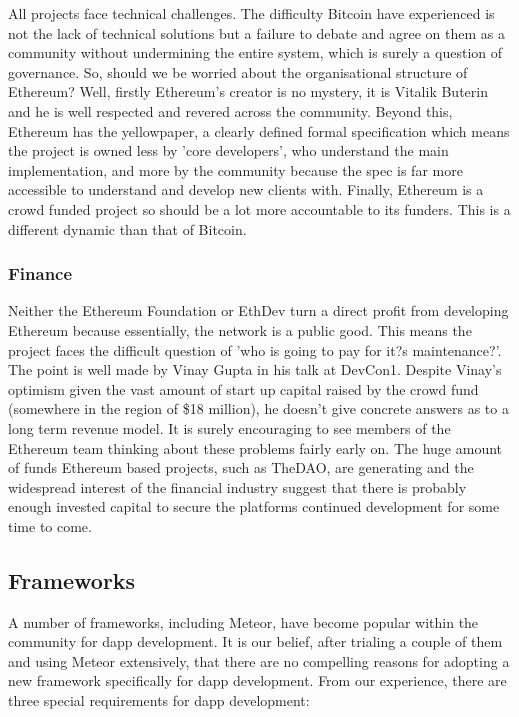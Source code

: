 All projects face technical challenges. The difficulty Bitcoin have experienced is not the lack of technical solutions but a failure to debate and agree on them as a community without undermining the entire system, which is surely a question of governance. So, should we be worried about the organisational structure of Ethereum? Well, firstly Ethereum's creator is no mystery, it is Vitalik Buterin and he is well respected and revered across the community. Beyond this, Ethereum has the yellowpaper\cite{wood2014ethereum}, a clearly defined formal specification which means the project is owned less by 'core developers', who understand the main implementation, and more by the community because the spec is far more accessible to understand and develop new clients with. Finally, Ethereum is a crowd funded project so should be a lot more accountable to its funders. This is a different dynamic than that of Bitcoin.\\

\subsubsection{Finance}
Neither the Ethereum Foundation or EthDev turn a direct profit from developing Ethereum because essentially, the network is a public good. This means the project faces the difficult question of 'who is going to pay for it?s maintenance?'. The point is well made by Vinay Gupta in his talk at DevCon1\cite{GuptaFinance}. Despite Vinay's optimism given the vast amount of start up capital raised by the crowd fund (somewhere in the region of \$18 million), he doesn't give concrete answers as to a long term revenue model. It is surely encouraging to see members of the Ethereum team thinking about these problems fairly early on. The huge amount of funds Ethereum based projects, such as TheDAO, are generating and the widespread interest of the financial industry suggest that there is probably enough invested capital to secure the platforms continued development for some time to come.

\subsection{Frameworks}
A number of frameworks, including Meteor, have become popular within the community for dapp development. It is our belief, after trialing a couple of them and using Meteor extensively, that there are no compelling reasons for adopting a new framework specifically for dapp development. From our experience, there are three special requirements for dapp development:

